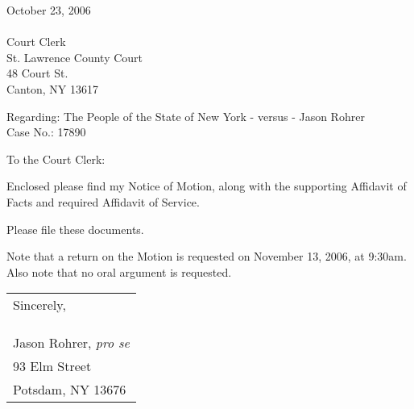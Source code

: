 \documentclass[12pt]{article}
\begin{document}
\noindent October 23, 2006\\
\\
Court Clerk\\
St. Lawrence County Court\\
48 Court St.\\
Canton, NY 13617

\vspace{0.5in}


Regarding: The People of the State of New York - versus - Jason Rohrer\\
Case No.: 17890

\vspace{0.5in}

To the Court Clerk:

\vspace{0.25in}

Enclosed please find my Notice of Motion, along with the supporting Affidavit of Facts and required Affidavit of Service.

Please file these documents.

Note that a return on the Motion is requested on November 13, 2006, at 9:30am.  Also note that no oral argument is requested.


\begin{flushright}
\begin{tabular}{l}
Sincerely,\\
\\
\\
\hline
\\
Jason Rohrer, {\em pro se}\\
93 Elm Street\\
Potsdam, NY 13676
\end{tabular}
\end{flushright}
\end{document}
